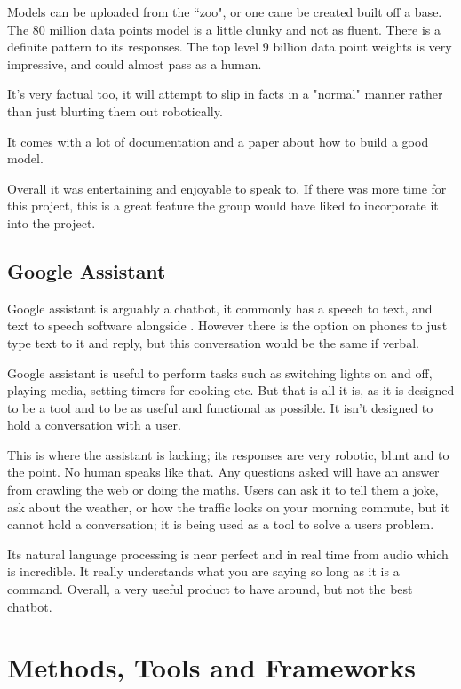 \documentclass[11pt]{article}
\begin{document}
	Models can be uploaded from the ``zoo", or one cane be created built off a base. The 80 million data points model is a little clunky and not as fluent. There is a definite pattern to its responses. The top level 9 billion data point weights is very impressive, and could almost pass as a human. 
	
	It's very factual too, it will attempt to slip in facts in a "normal" manner rather than just blurting them out robotically. 
	
	It comes with a lot of documentation and a paper about how to build a good model. 
	
	Overall it was entertaining and enjoyable to speak to. If there was more time for this project, this is a great feature the group would have liked to incorporate it into the project.
	
	\subsection{Google Assistant}
	Google assistant is arguably a chatbot, it commonly has a speech to text, and text to speech software alongside \citet{GoogleAssistant}. However there is the option on phones to just type text to it and reply, but this conversation would be the same if verbal.
	
	Google assistant is useful to perform tasks such as switching lights on and off, playing media, setting timers for cooking etc. But that is all it is, as it is designed to be a tool and to be as useful and functional as possible. It isn't designed to hold a conversation with a user. 
	
	This is where the assistant is lacking; its responses are very robotic, blunt and to the point. No human speaks like that. Any questions asked will have an answer from crawling the web or doing the maths. Users can ask it to tell them a joke, ask about the weather, or how the traffic looks on your morning commute, but it cannot hold a conversation; it is being used as a tool to solve a users problem.
	
	Its natural language processing is near perfect and in real time from audio which is incredible. It really understands what you are saying so long as it is a command. Overall, a very useful product to have around, but not the best chatbot.	
	
	\section{Methods, Tools and Frameworks} \label{Methods}
	     
\end{document}

